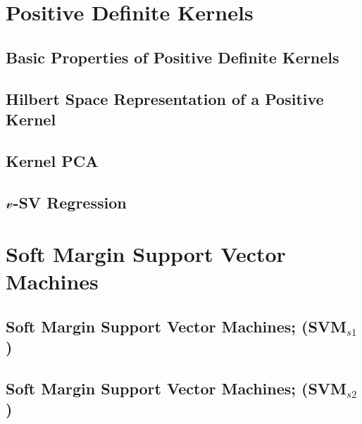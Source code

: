 \documentclass[a4paper]{article}
\begin{document}
\newpage
\section{Positive Definite Kernels}
\subsection{ Basic Properties of Positive Definite Kernels} %

\subsection{ Hilbert Space Representation of a Positive Kernel} %

\subsection{ Kernel PCA} %

\subsection{ $\mathcal{v}$-SV Regression} %


\newpage
\section{Soft Margin Support Vector Machines}
\subsection{ Soft Margin Support Vector Machines; (SVM$_{s1}$)} %

\subsection{ Soft Margin Support Vector Machines; (SVM$_{s2}$)} %
\end{document}
